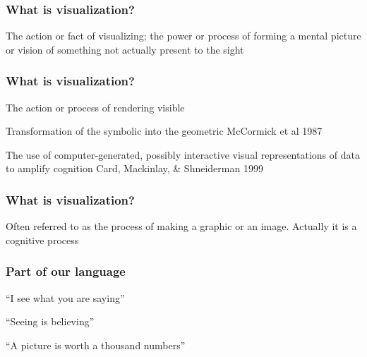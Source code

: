 \documentclass[12pt]{beamer}\usepackage[]{graphicx}\usepackage[]{color}
\begin{document}

\begin{frame}
\frametitle{What is visualization?}

The action or fact of visualizing; the power or process of forming
a mental picture or vision of something not actually present to the sight
\eb

\end{frame}


\begin{frame}
\frametitle{What is visualization?}

\bbi
  \item The action or process of rendering visible
  \item Transformation of the symbolic into the geometric 
  {\lolit McCormick et al 1987}
  \item The use of computer-generated, possibly interactive visual 
  representations of data to amplify cognition {\lolit Card, Mackinlay, \& Shneiderman 1999}
\ei
\eb

\end{frame}


\begin{frame}
\frametitle{What is visualization?}

Often referred to as the process of making a graphic or an image.
Actually it is a cognitive process
\eb

\end{frame}


\begin{frame}
\frametitle{Part of our language}

\bbi
  \item ``I see what you are saying''
  \item ``Seeing is believing''
  \item ``A picture is worth a thousand numbers''
\ei

\end{frame}

\end{document}
